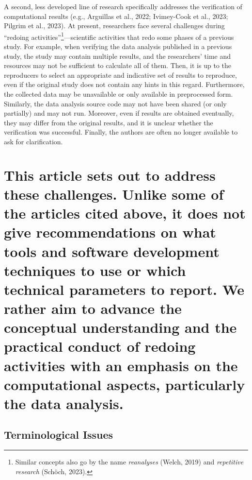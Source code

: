 \documentclass[authordate, empirical]{jote-new-article}
\begin{document}
	A second, less developed line of research specifically addresses the verification of computational results (e.g., Arguillas et al., 2022; Ivimey-Cook et al., 2023; Pilgrim et al., 2023). At present, researchers face several challenges during “redoing activities”\footnote{ Similar concepts also go by the name \emph{reanalyses} (Welch, 2019) and \emph{repetitive research} (Schöch, 2023).}—scientific activities that redo some phases of a previous study. For example, when verifying the data analysis published in a previous study, the study may contain multiple results, and the researchers' time and resources may not be sufficient to calculate all of them. Then, it is up to the reproducers to select an appropriate and indicative set of results to reproduce, even if the original study does not contain any hints in this regard. Furthermore, the collected data may be unavailable or only available in preprocessed form. Similarly, the data analysis source code may not have been shared (or only partially) and may not run. Moreover, even if results are obtained eventually, they may differ from the original results, and it is unclear whether the verification was successful. Finally, the authors are often no longer available to ask for clarification.



	\section{This article sets out to address these challenges. Unlike some of the articles cited above, it does not give recommendations on what tools and software development techniques to use or which technical parameters to report. We rather aim to advance the conceptual understanding and the practical conduct of redoing activities with an emphasis on the computational aspects, particularly the data analysis.}



	\subsection{Terminological Issues}
\end{document}
